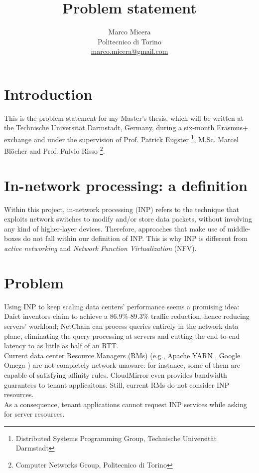 \documentclass[letterpaper,twocolumn,10pt]{article}
\begin{document}
\title{Problem statement}

\date{}

\author{
{   \rm Marco Micera}\\
    Politecnico di Torino\\
    \href{mailto:marco.micera@gmail.com}{marco.micera@gmail.com}
}
\maketitle

\section*{Introduction}
This is the problem statement for my Master's thesis, which will be written at the Technische Universit{\"a}t Darmstadt, Germany, during a six-month Erasmus+ exchange and under the supervision of Prof. Patrick Eugster \footnote[2]{\label{tuda} Distributed Systems Programming Group, Technische Universit{\"a}t Darmstadt}, M.Sc. Marcel Bl{\"o}cher  and Prof. Fulvio Risso \footnote[3]{\label{polito} Computer Networks Group, Politecnico di Torino}.

\section{In-network processing: a definition}
Within this project, in-network processing (INP) refers to the technique that exploits network switches to modify and/or store data packets, without involving any kind of higher-layer devices. Therefore, approaches that make use of middle-boxes do not fall within our definition of INP. This is why INP is different from \textit{active networking} and \textit{Network Function Virtualization} (NFV).

\section{Problem}
Using INP to keep scaling data centers' performance seems a promising idea: Daiet \cite{daiet} inventors claim to achieve a 86.9\%-89.3\% traffic reduction, hence reducing servers' workload; NetChain \cite{netchain} can process queries entirely in the network data plane, eliminating the query processing at servers and cutting the end-to-end latency to as little as half of an RTT.\\
Current data center Resource Managers (RMs) (e.g., Apache YARN \cite{yarn}, Google Omega \cite{omega}) are not completely network-unaware: for instance, some of them are capable of satisfying affinity rules. CloudMirror \cite{cloudmirror} even provides bandwidth guarantees to tenant applicaitons. Still, current RMs do not consider INP resources.\\
As a consequence, tenant applications cannot request INP services while asking for server resources.
\end{document}

